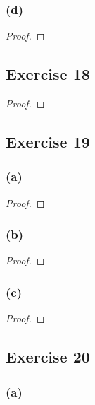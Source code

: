 \documentclass[14pt]{extarticle}
\begin{document}
\subsubsection{(d)}

\begin{proof}

\end{proof}

\subsection{Exercise 18}

\begin{proof}

\end{proof}

\subsection{Exercise 19}

\subsubsection{(a)}

\begin{proof}

\end{proof}

\subsubsection{(b)}

\begin{proof}

\end{proof}

\subsubsection{(c)}

\begin{proof}

\end{proof}

\subsection{Exercise 20}

\subsubsection{(a)}
\end{document}
